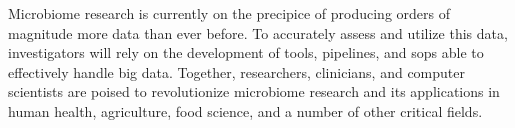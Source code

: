 Microbiome research is currently on the precipice of producing orders of magnitude
more data than ever before. To accurately assess and utilize this data, investigators
will rely on the development of tools, pipelines, and \gls{sop}s able to effectively
handle big data. Together, researchers, clinicians, and computer scientists are
poised to revolutionize microbiome research and its applications in human health,
agriculture, food science, and a number of other critical fields.
